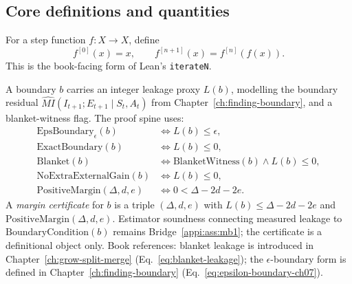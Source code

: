 \subsection{Core definitions and quantities}

\begin{definition}
\label{appi:def:spine-iteration}
For a step function \(f:X\to X\), define
\begin{equation}
\label{appi:eq:spine-iterate}
f^{[0]}(x)=x,\qquad f^{[n+1]}(x)=f^{[n]}(f(x)).
\end{equation}
This is the book-facing form of Lean's \texttt{iterateN}.
\end{definition}

\begin{definition}
\label{appi:def:spine-boundary}
A boundary \(b\) carries an integer leakage proxy \(L(b)\), modelling the boundary residual
\(\widehat{MI}(I_{t+1};E_{t+1}\mid S_t,A_t)\) from Chapter~\ref{ch:finding-boundary}, and a blanket-witness flag.
The proof spine uses:
\begin{align}
\label{appi:eq:epsilon-boundary}
\mathrm{EpsBoundary}_{\epsilon}(b) &\iff L(b)\leq \epsilon,\\
\label{appi:eq:exact-boundary}
\mathrm{ExactBoundary}(b) &\iff L(b)\leq 0,\\
\label{appi:eq:blanket}
\mathrm{Blanket}(b) &\iff \mathrm{BlanketWitness}(b)\wedge L(b)\leq 0,\\
\label{appi:eq:no-extra-gain}
\mathrm{NoExtraExternalGain}(b) &\iff L(b)\leq 0,\\
\label{appi:eq:positive-margin}
\mathrm{PositiveMargin}(\Delta,d,e) &\iff 0<\Delta-2d-2e .
\end{align}
A \emph{margin certificate} for \(b\) is a triple \((\Delta,d,e)\) with
\(L(b)\leq \Delta-2d-2e\) and \(\mathrm{PositiveMargin}(\Delta,d,e)\).
Estimator soundness connecting measured leakage to \(\mathrm{BoundaryCondition}(b)\) remains Bridge~\ref{appi:ass:mb1}; the certificate is a definitional object only.
Book references: blanket leakage is introduced in Chapter~\ref{ch:grow-split-merge} (Eq.~\eqref{eq:blanket-leakage}); the \(\epsilon\)-boundary form is defined in Chapter~\ref{ch:finding-boundary} (Eq.~\eqref{eq:epsilon-boundary-ch07}).
\end{definition}

